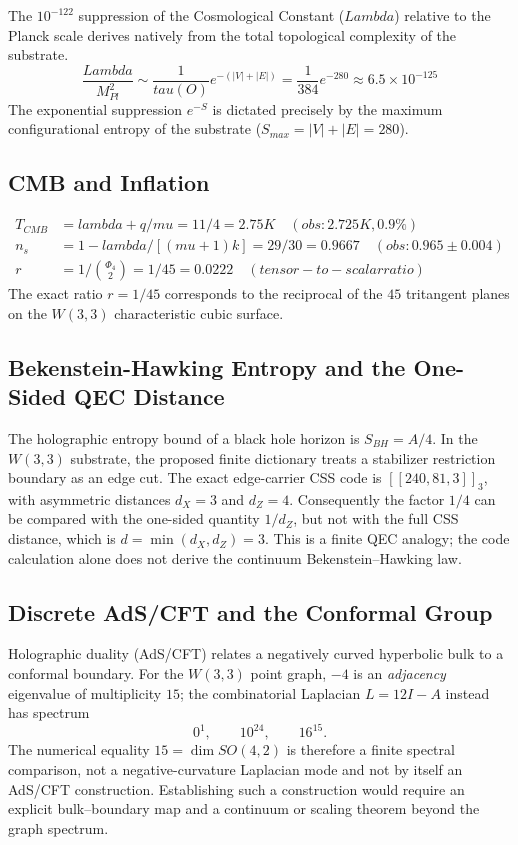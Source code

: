 \documentclass[12pt,a4paper]{article}
\def\text#1{#1}%
\def\lambda{lambda}%
\def\Lambda{Lambda}%
\def\mu{mu}%
\def\Phi#1{Phi#1}%
\def\tau{tau}%
\theoremstyle{definition}
\begin{document}
The $10^{-122}$ suppression of the Cosmological Constant ($\Lambda$) relative to the Planck scale derives natively from the total topological complexity of the substrate.
\begin{equation}
\frac{\Lambda}{M_{\text{Pl}}^2} \sim \frac{1}{\tau(O)} e^{-(|V| + |E|)} = \frac{1}{384} e^{-280} \approx 6.5 \times 10^{-125}
\end{equation}
The exponential suppression $e^{-S}$ is dictated precisely by the maximum configurational entropy of the substrate ($S_{\text{max}} = |V| + |E| = 280$).

\subsection{CMB and Inflation}

\begin{equation}
\begin{aligned}
T_{\text{CMB}} &= \lambda+q/\mu = 11/4 = 2.75\text{ K}
\quad(\text{obs: }2.725\text{ K, }0.9\%) \\
n_s &= 1-\lambda/[(\mu+1)k] = 29/30 = 0.9667
\quad(\text{obs: }0.965\pm 0.004) \\
r &= 1/\binom{\Phi_4}{2} = 1/45 = 0.0222
\quad(\text{tensor-to-scalar ratio})
\end{aligned}
\end{equation}
The exact ratio $r = 1/45$ corresponds to the reciprocal of the $45$ tritangent planes on the $W(3,3)$ characteristic cubic surface.

\subsection{Bekenstein-Hawking Entropy and the One-Sided QEC Distance}
The holographic entropy bound of a black hole horizon is $S_{\text{BH}} = A / 4$.
In the $W(3,3)$ substrate, the proposed finite dictionary treats a stabilizer
restriction boundary as an edge cut.  The exact edge-carrier CSS code is
$[[240,81,3]]_3$, with asymmetric distances $d_X=3$ and $d_Z=4$.  Consequently
the factor $1/4$ can be compared with the one-sided quantity $1/d_Z$, but not
with the full CSS distance, which is $d=\min(d_X,d_Z)=3$.  This is a finite
QEC analogy; the code calculation alone does not derive the continuum
Bekenstein--Hawking law.

\subsection{Discrete AdS/CFT and the Conformal Group}
Holographic duality (AdS/CFT) relates a negatively curved hyperbolic bulk to
a conformal boundary.  For the $W(3,3)$ point graph, $-4$ is an
\emph{adjacency} eigenvalue of multiplicity $15$; the combinatorial
Laplacian $L=12I-A$ instead has spectrum
\[
 0^1,\qquad 10^{24},\qquad 16^{15}.
\]
The numerical equality $15=\dim SO(4,2)$ is therefore a finite spectral
comparison, not a negative-curvature Laplacian mode and not by itself an
AdS/CFT construction.  Establishing such a construction would require an
explicit bulk--boundary map and a continuum or scaling theorem beyond the
graph spectrum.
\end{document}
